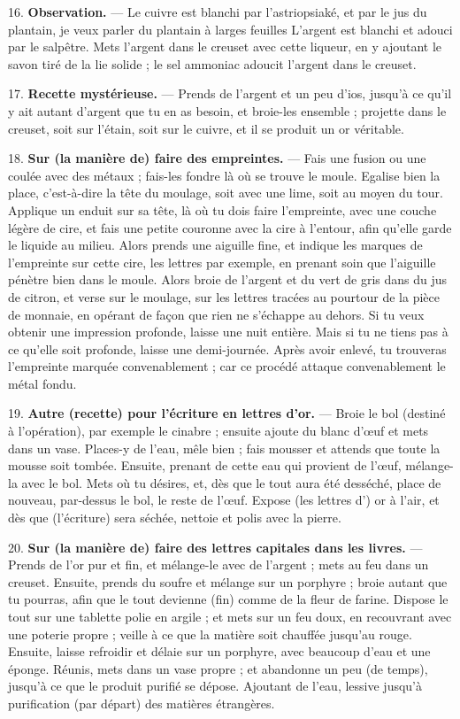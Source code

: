 \documentclass[a4paper, 11pt, oneside, polutonikogreek, french]{article}
\begin{document}
16. \textbf{Observation.} --- Le cuivre est blanchi par l'astriopsiaké, et par le jus du plantain, je veux parler du plantain à larges feuilles L'argent est blanchi et adouci par le salpêtre. Mets l'argent dans le creuset avec cette liqueur, en y ajoutant le savon tiré de la lie solide ; le sel ammoniac adoucit l'argent dans le creuset.

17. \textbf{Recette mystérieuse.} --- Prends de l'argent et un peu d'ios, jusqu'à ce qu'il y ait autant d'argent que tu en as besoin, et broie-les ensemble ; projette dans le creuset, soit sur l'étain, soit sur le cuivre, et il se produit un or véritable.

18. \textbf{Sur (la manière de) faire des empreintes.} --- Fais une fusion ou une coulée avec des métaux ; fais-les fondre là où se trouve le moule. Egalise bien la place, c'est-à-dire la tête du moulage, soit avec une lime, soit au moyen du tour. Applique un enduit sur sa tête, là où tu dois faire l'empreinte, avec une couche légère de cire, et fais une petite couronne avec la cire à l'entour, afin qu'elle garde le liquide au milieu. Alors prends une aiguille fine, et indique les marques de l'empreinte sur cette cire, les lettres par exemple, en prenant soin que l'aiguille pénètre bien dans le moule. Alors broie de l'argent et du vert de gris dans du jus de citron, et verse sur le moulage, sur les lettres tracées au pourtour de la pièce de monnaie, en opérant de façon que rien ne s'échappe au dehors. Si tu veux obtenir une impression profonde, laisse une nuit entière. Mais si tu ne tiens pas à ce qu'elle soit profonde, laisse une demi-journée. Après avoir enlevé, tu trouveras l'empreinte marquée convenablement ; car ce procédé attaque convenablement le métal fondu.

19. \textbf{Autre (recette) pour l'écriture en lettres d'or.} --- Broie le bol (destiné à l'opération), par exemple le cinabre ; ensuite ajoute du blanc d'œuf et mets dans un vase. Places-y de l'eau, mêle bien ; fais mousser et attends que toute la mousse soit tombée. Ensuite, prenant de cette eau qui provient de l'œuf, mélange-la avec le bol. Mets où tu désires, et, dès que le tout aura été desséché, place de nouveau, par-dessus le bol, le reste de l'œuf. Expose (les lettres d') or à l'air, et dès que (l'écriture) sera séchée, nettoie et polis avec la pierre.

20. \textbf{Sur (la manière de) faire des lettres capitales dans les livres.} --- Prends de l'or pur et fin, et mélange-le avec de l'argent ; mets au feu dans un creuset. Ensuite, prends du soufre et mélange sur un porphyre ; broie autant que tu pourras, afin que le tout devienne (fin) comme de la fleur de farine. Dispose le tout sur une tablette polie en argile ; et mets sur un feu doux, en recouvrant avec une poterie propre ; veille à ce que la matière soit chauffée jusqu'au rouge. Ensuite, laisse refroidir et délaie sur un porphyre, avec beaucoup d'eau et une éponge. Réunis, mets dans un vase propre ; et abandonne un peu (de temps), jusqu'à ce que le produit purifié se dépose. Ajoutant de l'eau, lessive jusqu'à purification (par départ) des matières étrangères.
\end{document}
